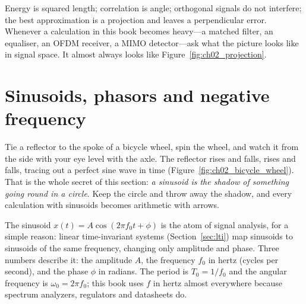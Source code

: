 \begin{keyidea}
Energy is squared length; correlation is angle; orthogonal signals do not interfere; the best
approximation is a projection and leaves a perpendicular error. Whenever a calculation in this
book becomes heavy---a matched filter, an equaliser, an OFDM receiver, a MIMO detector---ask what
the picture looks like in signal space. It almost always looks like
Figure~\ref{fig:ch02_projection}.
\end{keyidea}

\section{Sinusoids, phasors and negative frequency}
\label{sec:ch02:phasors}

Tie a reflector to the spoke of a bicycle wheel, spin the wheel, and watch it from the side with
your eye level with the axle. The reflector rises and falls, rises and falls, tracing out a perfect
sine wave in time (Figure~\ref{fig:ch02_bicycle_wheel}). That is the whole secret of this section:
\emph{a sinusoid is the shadow of something going round in a circle}. Keep the circle and throw away
the shadow, and every calculation with sinusoids becomes arithmetic with arrows.


The sinusoid $x(t)=A\cos(2\pi f_0 t+\phi)$ is the atom of signal analysis, for a simple reason:
linear time-invariant systems (Section~\ref{sec:lti}) map sinusoids to sinusoids of the same
frequency, changing only amplitude and phase. Three numbers describe it: the amplitude $A$, the
frequency $f_0$ in hertz (cycles per second), and the phase $\phi$ in radians. The period is
$T_0=1/f_0$ and the angular frequency is $\omega_0=2\pi f_0$; this book uses $f$ in hertz almost
everywhere because spectrum analyzers, regulators and datasheets do.

